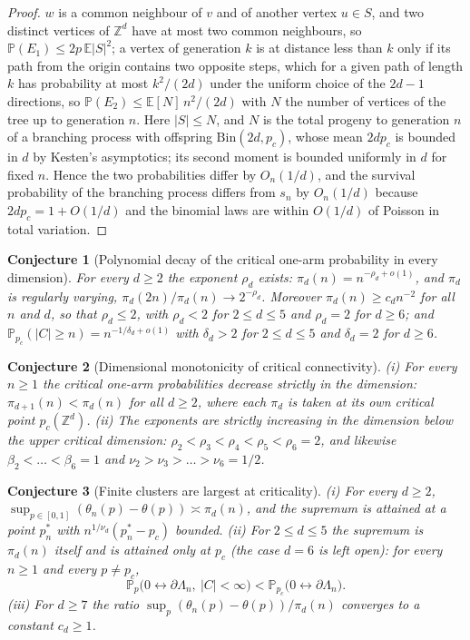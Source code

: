 \documentclass[11pt]{article}
\newtheorem{conjecture}{Conjecture}
\theoremstyle{definition}
\newcommand{\E}{\mathbb E}
\newcommand{\Pp}{\mathbb P}
\newcommand{\Z}{\mathbb Z}
\providecommand{\Z}{\mathbb Z}
\providecommand{\E}{\mathbb E}
\providecommand{\Pp}{\mathbb P}
\begin{document}
\begin{proof}
$w$ is a common neighbour of $v$ and of another vertex $u\in S$, and two
distinct vertices of $\Z^d$ have at most two common neighbours, so
$\Pp(E_1)\le2p\,\E|S|^2$; a vertex of generation $k$ is at distance less
than $k$ only if its path from the origin contains two opposite steps,
which for a given path of length $k$ has probability at most
$k^2/(2d)$ under the uniform choice of the $2d-1$ directions, so
$\Pp(E_2)\le\E[N]\,n^2/(2d)$ with $N$ the number of vertices of the tree
up to generation $n$.  Here $|S|\le N$, and $N$ is the total progeny to
generation $n$ of a branching process with offspring $\mathrm{Bin}(2d,p_c)$,
whose mean $2dp_c$ is bounded in $d$ by Kesten's
asymptotics; its second moment is bounded uniformly in
$d$ for fixed $n$.  Hence the two probabilities differ by $O_n(1/d)$, and
the survival probability of the branching process differs from $s_n$ by
$O_n(1/d)$ because $2dp_c=1+O(1/d)$ and the
binomial laws are within $O(1/d)$ of Poisson in total variation.
\end{proof}

\begin{conjecture}[Polynomial decay of the critical one-arm probability in every dimension]\label{av1}
For every $d\ge2$ the exponent $\rho_d$ exists: $\pi_d(n)=n^{-\rho_d+o(1)}$,
and $\pi_d$ is regularly varying, $\pi_d(2n)/\pi_d(n)\to2^{-\rho_d}$.
Moreover $\pi_d(n)\ge c_dn^{-2}$ for all $n$ and $d$, so that
$\rho_d\le2$, with $\rho_d<2$ for $2\le d\le5$ and $\rho_d=2$ for
$d\ge6$; and $\Pp_{p_c}(|C|\ge n)=n^{-1/\delta_d+o(1)}$ with
$\delta_d>2$ for $2\le d\le5$ and $\delta_d=2$ for $d\ge6$.
\end{conjecture}


\begin{conjecture}[Dimensional monotonicity of critical connectivity]\label{av2}
{\rm(i)} For every $n\ge1$ the critical one-arm probabilities decrease
strictly in the dimension: $\pi_{d+1}(n)<\pi_d(n)$ for all $d\ge2$, where
each $\pi_d$ is taken at its own critical point $p_c(\Z^d)$.
{\rm(ii)} The exponents are strictly increasing in the dimension below
the upper critical dimension: $\rho_2<\rho_3<\rho_4<\rho_5<\rho_6=2$, and
likewise $\beta_2<\dots<\beta_6=1$ and $\nu_2>\nu_3>\dots>\nu_6=1/2$.
\end{conjecture}


\begin{conjecture}[Finite clusters are largest at criticality]\label{av3}
{\rm(i)} For every $d\ge2$, $\sup_{p\in[0,1]}(\theta_n(p)-\theta(p))\asymp\pi_d(n)$,
and the supremum is attained at a point $p_n^*$ with
$n^{1/\nu_d}(p_n^*-p_c)$ bounded.
{\rm(ii)} For $2\le d\le5$ the supremum is $\pi_d(n)$ itself and is
attained only at $p_c$ (the case $d=6$ is left open): for every $n\ge1$ and every $p\ne p_c$,
\[
 \Pp_p\bigl(0\leftrightarrow\partial\Lambda_n,\ |C|<\infty\bigr)<\Pp_{p_c}\bigl(0\leftrightarrow\partial\Lambda_n\bigr).
\]
{\rm(iii)} For $d\ge7$ the ratio $\sup_p(\theta_n(p)-\theta(p))/\pi_d(n)$
converges to a constant $c_d\ge1$.
\end{conjecture}
\end{document}
